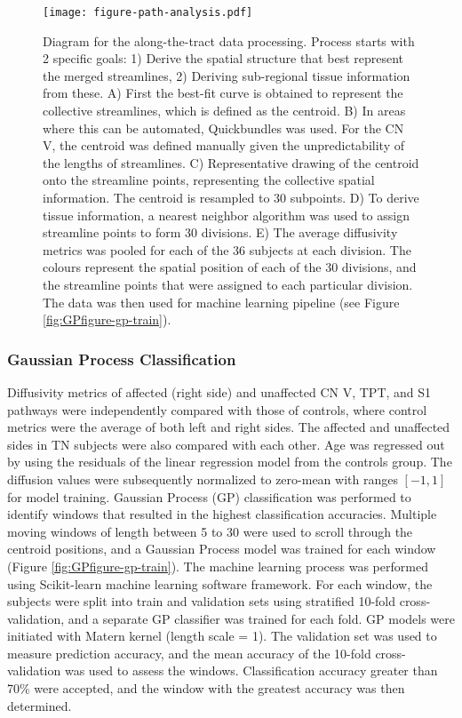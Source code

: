 \begin{figure}[ht]
\centering
\texttt{[image: figure-path-analysis.pdf]}
\caption{Diagram for the along-the-tract data processing.
Process starts with 2 specific goals: 1) Derive the spatial structure that best represent the merged streamlines, 2) Deriving sub-regional tissue information from these. A) First the best-fit curve is obtained to represent the collective streamlines, which is defined as the centroid. B) In areas where this can be automated, Quickbundles was used. For the CN V, the centroid was defined manually given the unpredictability of the lengths of streamlines. C) Representative drawing of the centroid onto the streamline points, representing the collective spatial information. The centroid is resampled to 30 subpoints. D) To derive tissue information, a nearest neighbor algorithm was used to assign streamline points to form 30 divisions. E) The average diffusivity metrics was pooled for each of the 36 subjects at each division. The colours represent the spatial position of each of the 30 divisions, and the streamline points that were assigned to each particular division. The data was then used for machine learning pipeline (see Figure \ref{fig:GPfigure-gp-train}).
}
\label{fig:GPfigure-method-centroid}
\end{figure}

\subsubsection{Gaussian Process Classification}

Diffusivity metrics of affected (right side) and unaffected CN V, TPT, and S1 pathways were independently compared with those of controls, where control metrics were the average of both left and right sides. The affected and unaffected sides in TN subjects were also compared with each other. 
Age was regressed out by using the residuals of the linear regression model from the controls group. The diffusion values were subsequently normalized to zero-mean with ranges $[-1, 1]$ for model training. 
Gaussian Process (GP) classification was performed to identify windows that resulted in the highest classification accuracies. Multiple moving windows of length between 5 to 30 were used to scroll through the centroid positions, and a Gaussian Process model was trained for each window (Figure \ref{fig:GPfigure-gp-train}). The machine learning process was performed using Scikit-learn machine learning software framework.
For each window, the subjects were split into train and validation sets using stratified 10-fold cross-validation, and a separate GP classifier was trained for each fold. GP models were initiated with Matern kernel (length scale = 1). The validation set was used to measure prediction accuracy, and the mean accuracy of the 10-fold cross-validation was used to assess the windows. Classification accuracy greater than 70\% were accepted, and the window with the greatest accuracy was then determined. 

